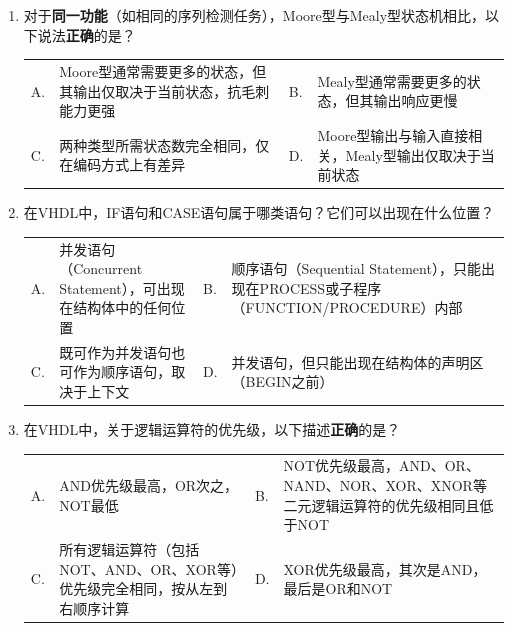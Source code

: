 \begin{enumerate}[label=\arabic*.]
\vspace{0.8cm}

\item 对于\textbf{同一功能}（如相同的序列检测任务），Moore型与Mealy型状态机相比，以下说法\textbf{正确}的是？

\vspace{0.3cm}

\begin{tabular}{@{}lp{}@{\qquad}lp{}@{}}
A. & Moore型通常需要更多的状态，但其输出仅取决于当前状态，抗毛刺能力更强 &
B. & Mealy型通常需要更多的状态，但其输出响应更慢 \\
C. & 两种类型所需状态数完全相同，仅在编码方式上有差异 &
D. & Moore型输出与输入直接相关，Mealy型输出仅取决于当前状态 \\
\end{tabular}

\vspace{0.8cm}

\item 在VHDL中，IF语句和CASE语句属于哪类语句？它们可以出现在什么位置？

\vspace{0.3cm}

\begin{tabular}{@{}lp{}@{\qquad}lp{}@{}}
A. & 并发语句（Concurrent Statement），可出现在结构体中的任何位置 &
B. & 顺序语句（Sequential Statement），只能出现在PROCESS或子程序（FUNCTION/PROCEDURE）内部 \\
C. & 既可作为并发语句也可作为顺序语句，取决于上下文 &
D. & 并发语句，但只能出现在结构体的声明区（BEGIN之前） \\
\end{tabular}

\vspace{0.8cm}

\item 在VHDL中，关于逻辑运算符的优先级，以下描述\textbf{正确}的是？

\vspace{0.3cm}

\begin{tabular}{@{}lp{}@{\qquad}lp{}@{}}
A. & AND优先级最高，OR次之，NOT最低 &
B. & NOT优先级最高，AND、OR、NAND、NOR、XOR、XNOR等二元逻辑运算符的优先级相同且低于NOT \\
C. & 所有逻辑运算符（包括NOT、AND、OR、XOR等）优先级完全相同，按从左到右顺序计算 &
D. & XOR优先级最高，其次是AND，最后是OR和NOT \\
\end{tabular}

\end{enumerate}

